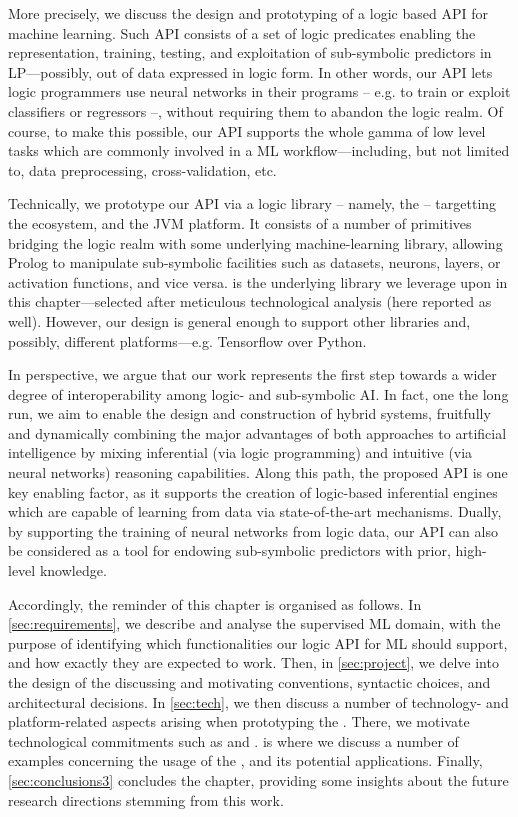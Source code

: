 \documentclass[12pt,a4paper,openright,twoside]{book}
\begin{document}
More precisely, we discuss the design and prototyping of a logic based API for machine learning.
%
Such API consists of a set of logic predicates enabling the representation, training, testing, and exploitation of sub-symbolic predictors in LP---possibly, out of data expressed in logic form.
%
In other words, our API lets logic programmers use neural networks in their programs -- e.g. to train or exploit classifiers or regressors --, without requiring them to abandon the logic realm.
%
Of course, to make this possible, our API supports the whole gamma of low level tasks which are commonly involved in a ML workflow---including, but not limited to, data preprocessing, cross-validation, etc.

Technically, we prototype our API via a logic library -- namely, the \mllib{} -- targetting the \twopkt{} ecosystem, and the JVM platform.
%
It consists of a number of primitives bridging the logic realm with some underlying machine-learning library, allowing Prolog to manipulate sub-symbolic facilities such as datasets, neurons, layers, or activation functions, and vice versa.
%
\deeplearningforj{} is the underlying library we leverage upon in this chapter---selected after meticulous technological analysis (here reported as well).
%
However, our design is general enough to support other libraries and, possibly, different platforms---e.g. Tensorflow over Python.

In perspective, we argue that our work represents the first step towards a wider degree of interoperability among logic- and sub-symbolic AI.
%
In fact, one the long run, we aim to enable the design and construction of hybrid systems, fruitfully and dynamically combining the major advantages of both approaches to artificial intelligence by mixing inferential (via logic programming) and intuitive (via neural networks) reasoning capabilities.
%
Along this path, the proposed API is one key enabling factor, as it supports the creation of logic-based inferential engines which are capable of learning from data via state-of-the-art mechanisms.
%
Dually, by supporting the training of neural networks from logic data, our API can also be considered as a tool for endowing sub-symbolic predictors with prior, high-level knowledge.

Accordingly, the reminder of this chapter is organised as follows.
%
In \cref{sec:requirements}, we describe and analyse the supervised ML domain, with the purpose of identifying which functionalities our logic API for ML should support, and how exactly they are expected to work.
%
Then, in \cref{sec:project}, we delve into the design of the \mllib{} discussing and motivating conventions, syntactic choices, and architectural decisions.
%
In \cref{sec:tech}, we then discuss a number of technology- and platform-related aspects arising when prototyping the \mllib{}.
%
There, we motivate technological commitments such as \twopkt{} and \deeplearningforj{}.
%
 is where we discuss a number of examples concerning the usage of the \mllib{}, and its potential applications.
%
Finally, \cref{sec:conclusions3} concludes the chapter, providing some insights about the future research directions stemming from this work.
\end{document}
